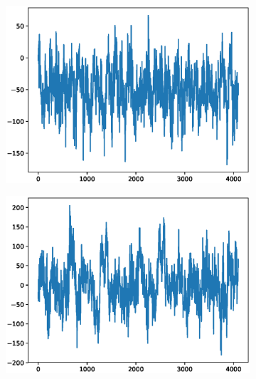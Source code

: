 \documentclass[12pt]{article}
\begin{document}
\begin{figure}
\begin{subfigure}{.25\textwidth}
\end{subfigure}
\begin{subfigure}{.25\textwidth}
  \centering
  \includegraphics[width=.8\linewidth]{figures/signals/A/Z028.eps}
\end{subfigure}%
\begin{subfigure}{.25\textwidth}
  \centering
  \includegraphics[width=.8\linewidth]{figures/signals/A/Z035.eps}
\end{subfigure}


\end{figure}
\end{document}
